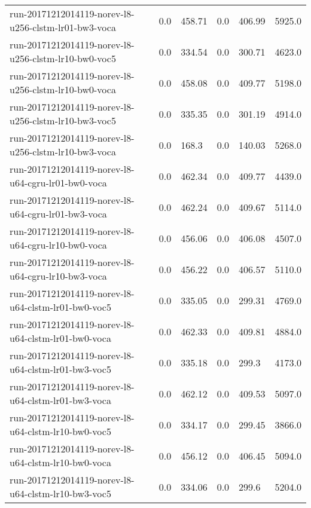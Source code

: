 \begin{landscape}
\begin{longtable}{p{.47\textheight} p{.08\textheight} p{.08\textheight} p{.08\textheight} p{.08\textheight} p{.08\textheight}}
    run-20171212014119-norev-l8-u256-clstm-lr01-bw3-voca & \num{0.0} & \num{458.71} & \num{0.0} & \num{406.99} & \num{5925.0}\\
    run-20171212014119-norev-l8-u256-clstm-lr10-bw0-voc5 & \num{0.0} & \num{334.54} & \num{0.0} & \num{300.71} & \num{4623.0}\\
    run-20171212014119-norev-l8-u256-clstm-lr10-bw0-voca & \num{0.0} & \num{458.08} & \num{0.0} & \num{409.77} & \num{5198.0}\\
    run-20171212014119-norev-l8-u256-clstm-lr10-bw3-voc5 & \num{0.0} & \num{335.35} & \num{0.0} & \num{301.19} & \num{4914.0}\\
    run-20171212014119-norev-l8-u256-clstm-lr10-bw3-voca & \num{0.0} & \num{168.3} & \num{0.0} & \num{140.03} & \num{5268.0}\\
    run-20171212014119-norev-l8-u64-cgru-lr01-bw0-voca & \num{0.0} & \num{462.34} & \num{0.0} & \num{409.77} & \num{4439.0}\\
    run-20171212014119-norev-l8-u64-cgru-lr01-bw3-voca & \num{0.0} & \num{462.24} & \num{0.0} & \num{409.67} & \num{5114.0}\\
    run-20171212014119-norev-l8-u64-cgru-lr10-bw0-voca & \num{0.0} & \num{456.06} & \num{0.0} & \num{406.08} & \num{4507.0}\\
    run-20171212014119-norev-l8-u64-cgru-lr10-bw3-voca & \num{0.0} & \num{456.22} & \num{0.0} & \num{406.57} & \num{5110.0}\\
    run-20171212014119-norev-l8-u64-clstm-lr01-bw0-voc5 & \num{0.0} & \num{335.05} & \num{0.0} & \num{299.31} & \num{4769.0}\\
    run-20171212014119-norev-l8-u64-clstm-lr01-bw0-voca & \num{0.0} & \num{462.33} & \num{0.0} & \num{409.81} & \num{4884.0}\\
    run-20171212014119-norev-l8-u64-clstm-lr01-bw3-voc5 & \num{0.0} & \num{335.18} & \num{0.0} & \num{299.3} & \num{4173.0}\\
    run-20171212014119-norev-l8-u64-clstm-lr01-bw3-voca & \num{0.0} & \num{462.12} & \num{0.0} & \num{409.53} & \num{5097.0}\\
    run-20171212014119-norev-l8-u64-clstm-lr10-bw0-voc5 & \num{0.0} & \num{334.17} & \num{0.0} & \num{299.45} & \num{3866.0}\\
    run-20171212014119-norev-l8-u64-clstm-lr10-bw0-voca & \num{0.0} & \num{456.12} & \num{0.0} & \num{406.45} & \num{5094.0}\\
    run-20171212014119-norev-l8-u64-clstm-lr10-bw3-voc5 & \num{0.0} & \num{334.06} & \num{0.0} & \num{299.6} & \num{5204.0}\\

\end{longtable}
\end{landscape}
